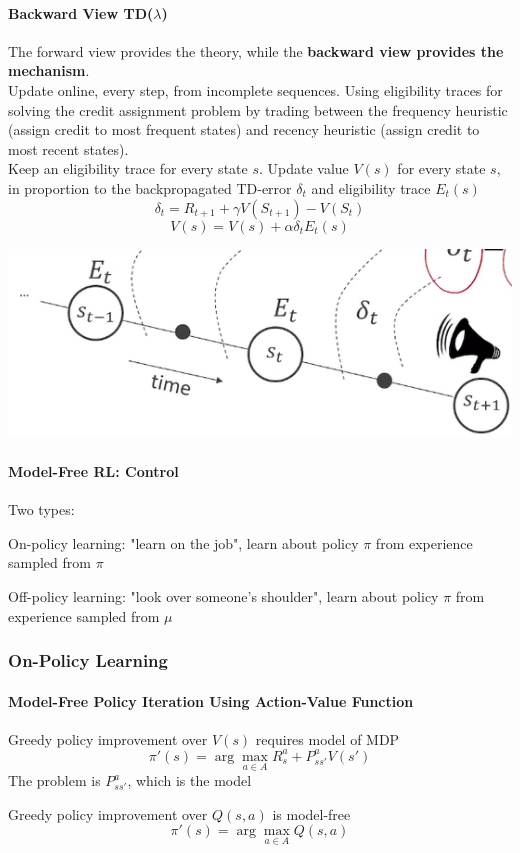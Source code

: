 \documentclass[10pt]{report}
\begin{document}
\paragraph{Backward View TD($\lambda$)} The forward view provides the theory, while the \textbf{backward view provides the mechanism}.\\
Update online, every step, from incomplete sequences. Using eligibility traces for solving the credit assignment problem by trading between the frequency heuristic (assign credit to most frequent states) and recency heuristic (assign credit to most recent states).\\
Keep an eligibility trace for every state $s$. Update value $V(s)$ for every state $s$, in proportion to the backpropagated TD-error $\delta_t$ and eligibility trace $E_t(s)$
$$\delta_t = R_{t+1} + \gamma V(S_{t+1}) - V(S_t)$$
$$V(s) = V(s) + \alpha\delta_t E_t(s)$$
\begin{center}
	\includegraphics[scale=0.5]{171.png}
\end{center}
\paragraph{Model-Free RL: Control} Two types:
\begin{list}{}{}
	\item On-policy learning: "learn on the job", learn about policy $\pi$ from experience sampled from $\pi$
	\item Off-policy learning: "look over someone's shoulder", learn about policy $\pi$ from experience sampled from $\mu$
\end{list}
\subsubsection{On-Policy Learning}
\paragraph{Model-Free Policy Iteration Using Action-Value Function}
\begin{list}{}{}
	\item Greedy policy improvement over $V(s)$ requires model of MDP
	$$\pi'(s) = \arg\max_{a\in A}R_s^a + P_{ss'}^aV(s')$$
	The problem is $P_{ss'}^a$, which is the model
	\item Greedy policy improvement over $Q(s,a)$ is model-free
	$$\pi'(s) = \arg\max_{a\in A}Q(s,a)$$
\end{list}
\end{document}
